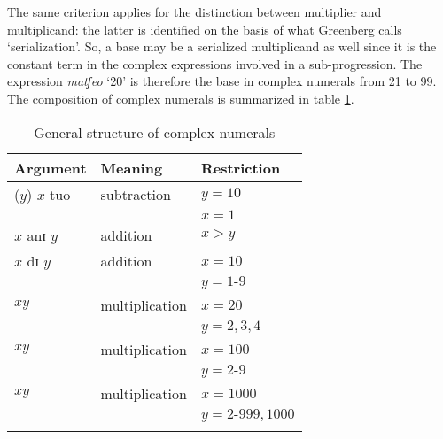 \begin{exe}
\begin{exe}
\begin{exe}
{\begin{exe}
\begin{exe}
\begin{exe}
\begin{exe}
\begin{exe}
\begin{exe}
\begin{exe}
\begin{xlist}
\begin{exe}
\begin{exe}
\begin{exe}
The same criterion applies for the distinction between multiplier and
multiplicand: the latter  is identified on the basis of what Greenberg calls
`serialization'. So, a  base may be   a serialized multiplicand as well since it
is the constant term in the complex expressions involved in a sub-progression.
The expression  {\it matʃeo} `20' is therefore the base in complex numerals  
from 21
to 99. The composition of complex numerals is summarized in table
\ref{tab:threecompo}.


\begin{table}[h]
\caption{General structure of complex numerals  \label{tab:threecompo}}
  \centering

\begin{tabular}{lll}
\lsptoprule
  Argument & Meaning & Restriction\\
\midrule
 ($y$)   $x$   tuo  & subtraction  &$y={10}$\\
&& $x={1}$\\ 
   $x$ anɪ $y$ & addition  &$x>y$ \\
$x$ dɪ $y$  & addition &$x={10}$ \\
&& $y={1 \textrm{-}9}$\\ %

$x y$ & multiplication &$x=20$  \\
&& $y={2,3,4}$\\ %
$x y$  & multiplication  &$x={100}$ \\
&& $y={2 \textrm{-}9}$\\ %
$x y$  & multiplication  &$x={1000}$ \\
&& $y={2 \textrm{-}999, 1000}$\\ %
\lspbottomrule
\end{tabular}
\end{table}



\end{exe}
\end{exe}
\end{exe}
\end{xlist}
\end{exe}
\end{exe}
\end{exe}
\end{exe}
\end{exe}
\end{exe}
\end{exe}}
\end{exe}
\end{exe}
\end{exe}
